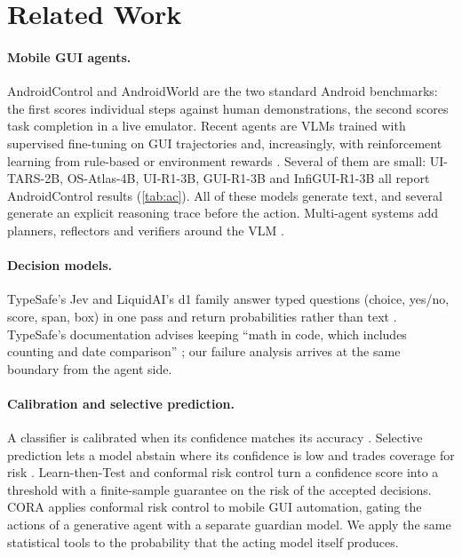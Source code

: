 \documentclass{article}
\begin{document}
\section{Related Work}
\label{sec:related}

\paragraph{Mobile GUI agents.}
AndroidControl \citep{androidcontrol2024} and AndroidWorld \citep{androidworld2024} are the two standard
Android benchmarks: the first scores individual steps against human demonstrations, the second scores task
completion in a live emulator. Recent agents are VLMs trained with supervised fine-tuning on GUI trajectories
\citep{osatlas,aguvis,uitars2025} and, increasingly, with reinforcement learning from rule-based or
environment rewards \citep{uir1,guir1,infiguir1,uigenie,mobilerl2025}. Several of them are small: UI-TARS-2B,
OS-Atlas-4B, UI-R1-3B, GUI-R1-3B and InfiGUI-R1-3B all report AndroidControl results (\cref{tab:ac}). All of
these models generate text, and several generate an explicit reasoning trace before the action. Multi-agent
systems add planners, reflectors and verifiers around the VLM \citep{mobileagentv3,vdroid2025,androidgen2025}.

\paragraph{Decision models.}
TypeSafe's Jev and LiquidAI's d1 family answer typed questions (choice, yes/no, score, span, box) in one pass
and return probabilities rather than text \citep{typesafe2026,liquidd12026}. TypeSafe's documentation advises
keeping ``math in code, which includes counting and date comparison'' \citep{typesafelimits2026}; our failure
analysis arrives at the same boundary from the agent side.

\paragraph{Calibration and selective prediction.}
A classifier is calibrated when its confidence matches its accuracy \citep{guo2017calibration}. Selective
prediction lets a model abstain where its confidence is low and trades coverage for risk
\citep{geifman2017selective}. Learn-then-Test \citep{angelopoulos2021ltt} and conformal risk control
\citep{angelopoulos2024crc} turn a confidence score into a threshold with a finite-sample guarantee on the risk
of the accepted decisions. CORA \citep{cora2026} applies conformal risk control to mobile GUI automation, gating
the actions of a generative agent with a separate guardian model. We apply the same statistical tools to the
probability that the acting model itself produces.
\end{document}
